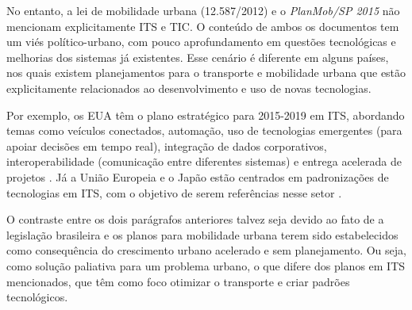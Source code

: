 \documentclass[
	12pt,				%
	oneside,			%
	a4paper,			%
	english,			%
	brazil				%
	]{abntex2ppgsi}
\begin{document}
No entanto, a lei de mobilidade urbana (12.587/2012) e o \textit{PlanMob/SP 2015} não mencionam explicitamente ITS e TIC. O conteúdo de ambos os documentos tem um viés político-urbano, com pouco aprofundamento em questões tecnológicas e melhorias dos sistemas já existentes. Esse cenário é diferente em alguns países, nos quais existem planejamentos para o transporte e mobilidade urbana que estão explicitamente relacionados ao desenvolvimento e uso de novas tecnologias.

Por exemplo, os EUA têm o plano estratégico para 2015-2019 em ITS, abordando temas como veículos conectados, automação, uso de tecnologias emergentes (para apoiar decisões em tempo real), integração de dados corporativos, interoperabilidade (comunicação entre diferentes sistemas) e entrega acelerada de projetos \cite{itsdot}. Já a União Europeia e o Japão estão centrados em padronizações de tecnologias em ITS, com o objetivo de serem referências nesse setor \cite{consulo2016evaluation}.

O contraste entre os dois parágrafos anteriores talvez seja devido ao fato de a legislação brasileira e os planos para mobilidade urbana terem sido estabelecidos como consequência do crescimento urbano acelerado e sem planejamento. Ou seja, como solução paliativa para um problema urbano, o que difere dos planos em ITS mencionados, que têm como foco otimizar o transporte e criar padrões tecnológicos. 
\end{document}
